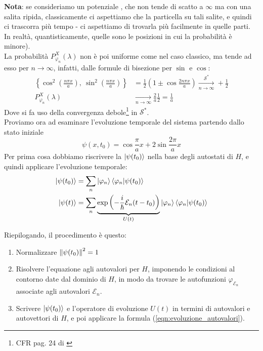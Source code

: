 \documentclass[../../FisicaTeorica.tex]{subfiles}
\begin{document}
\textbf{Nota}: se consideriamo un potenziale , che non tende di scatto a $\infty$ ma  con una salita ripida, classicamente ci aspettiamo che la particella  su tali salite, e quindi ci trascorra più tempo - ci aspettiamo di trovarla più facilmente in quelle parti. In realtà, quantisticamente, quelle sono le posizioni in cui la probabilità è minore).\\

La probabilità $P^X_{\varphi_n}(\lambda)$ non è poi uniforme come nel caso classico, ma tende ad esso per $n\to\infty$, infatti, dalle formule di bisezione per $\sin$ e $\cos$:
\begin{align*}
\left\{\cos^2 \left(\frac{n\pi x}{a}\right),\>
\sin^2 \left(\frac{n\pi x}{a}\right)\right\} &= \frac{1}{2}\left(1\pm \cos \frac{2n\pi x}{a} \right)\xrightarrow[n\to\infty]{\mathcal{S}^*} +\frac{1}{2}\\
P_{\varphi_n}^X(\lambda) &\xrightarrow[n\to\infty]{} \frac{2}{a}\frac{1}{2} = \frac{1}{a}
\end{align*} %
Dove si fa uso della convergenza debole\footnote{CFR pag. 24 di \cite{spazi_hilbert}} in $\mathcal{S}^*$.\\

Proviamo ora ad esaminare l'evoluzione temporale del sistema partendo dallo stato iniziale 
\begin{equation}
\psi(x,t_0) = \cos\frac{\pi}{a} x+2\sin\frac{2\pi}{a}x
\label{eqn:stato_iniziale}
\end{equation}
Per prima cosa dobbiamo riscrivere la $\ket{\psi(t_0)}$ nella base degli autostati di $H$, e quindi applicare l'evoluzione temporale:
\begin{align}
\ket{\psi(t_0)} &= \sum_n \ket{\varphi_n}\braket{\varphi_n|\psi(t_0)}\nonumber \\
\label{eqn:evoluzione_autovalori}
\ket{\psi(t)} &= \sum_n \underbrace{\exp\left(-\frac{i}{\hbar}\mathcal{E}_n(t-t_0)\right)}_{U(t)}\ket{\varphi_n}\braket{\varphi_n|\psi(t_0)}
\end{align}

Riepilogando, il procedimento è questo:
\begin{enumerate}
\item Normalizzare $\left\lVert\psi(t_0)\right\rVert^2 = 1$\\
\item Risolvere l'equazione agli autovalori per $H$, imponendo le condizioni al contorno date dal dominio di $H$, in modo da trovare le autofunzioni $\varphi_{\mathcal{E}_n}$ associate agli autovalori $\mathcal{E}_n$.
\item Scrivere $\ket{\psi(t_0)}$ e l'operatore di evoluzione $U(t)$ in termini di autovalori e autovettori di $H$, e poi applicare la formula (\ref{eqn:evoluzione_autovalori}).
\end{enumerate}
\end{document}

